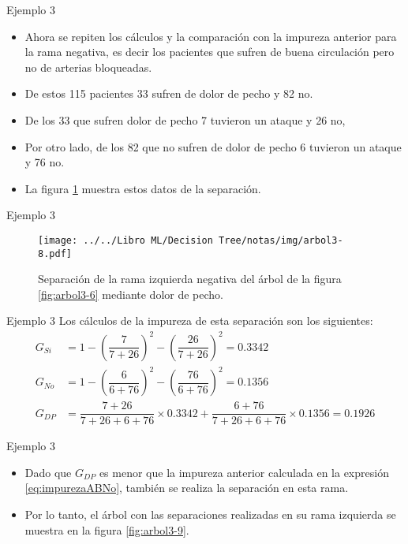 \documentclass[11pt,aspectratio=169]{beamer}
\begin{document}
\begin{frame}{Ejemplo 3}
	\begin{itemize}
		\item Ahora se repiten los cálculos y la comparación con la impureza anterior para la rama negativa, 
		es decir los pacientes que sufren de buena circulación pero no de arterias bloqueadas.\pause
		\item De estos 115 pacientes 33 sufren de dolor de pecho y 82 no. \pause 
		\item De los 33 que sufren dolor de pecho 7 tuvieron un ataque y 26 no\pause, 
		\item Por otro lado, de los 82 que no sufren de dolor de pecho 6 tuvieron un ataque y 76 no.\pause
		\item La figura \ref{fig:arbol3-8} muestra estos datos de la separación.
	\end{itemize}
\end{frame}

\begin{frame}{Ejemplo 3}
	\begin{figure}[H]
		\centering
		\texttt{[image: ../../Libro ML/Decision Tree/notas/img/arbol3-8.pdf]}
		\caption{Separación de la rama izquierda negativa del árbol de la figura \ref{fig:arbol3-6} mediante dolor de pecho.}
		\label{fig:arbol3-8}
	\end{figure}
\end{frame}

\begin{frame}{Ejemplo 3}
	Los cálculos de la impureza de esta separación son los siguientes:
	\begin{align*}
		G_{Si} &= 1 - \left(\dfrac{7}{7+26}\right)^2 - \left(\dfrac{26}{7+26}\right)^2 = 0.3342\\
		G_{No} &= 1 - \left(\dfrac{6}{6+76}\right)^2 - \left(\dfrac{76}{6+76}\right)^2 = 0.1356\\
		G_{DP} &= \dfrac{7+26}{7+26+6+76}\times 0.3342 + \dfrac{6+76}{7+26+6+76}\times 0.1356 = 0.1926
	\end{align*}
\end{frame}

\begin{frame}{Ejemplo 3}
	\begin{itemize}
		\item Dado que $G_{DP}$ es menor que la impureza anterior calculada en la expresión \ref{eq:impurezaABNo}, 
			también se realiza la separación en esta rama.\pause
		\item Por lo tanto, el árbol con las separaciones realizadas en su rama izquierda se muestra en la figura 
			\ref{fig:arbol3-9}.
	\end{itemize}
\end{frame}
\end{document}

